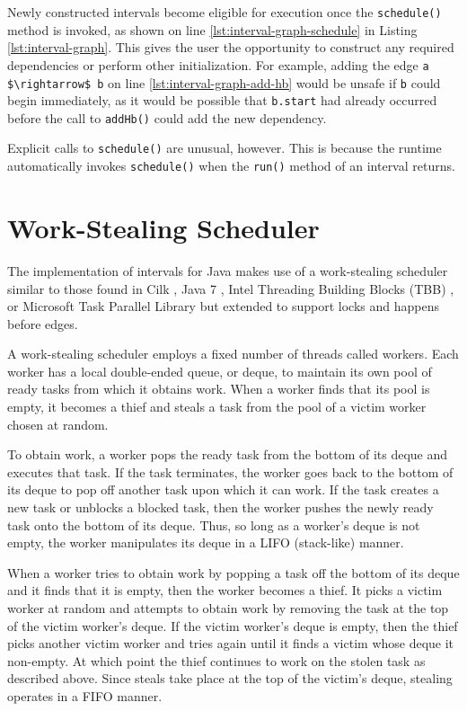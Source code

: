 Newly constructed intervals become eligible for execution once the
\lstinline|schedule()| method is invoked, as shown on line
\ref{lst:interval-graph-schedule} in Listing
\ref{lst:interval-graph}. This gives the user the opportunity to
construct any required dependencies or perform other
initialization. For example, adding the edge
\lstinline|a $\rightarrow$ b| on line \ref{lst:interval-graph-add-hb}
would be unsafe if \lstinline|b| could begin immediately, as it would
be possible that \lstinline|b.start| had already occurred before the
call to \lstinline|addHb()| could add the new dependency.

Explicit calls to \lstinline|schedule()| are unusual, however. This is
because the runtime automatically invokes \lstinline|schedule()| when
the \lstinline|run()| method of an interval returns.


\section{Work-Stealing Scheduler}
\label{sec:intro-work-stealing-scheduler}

The implementation of intervals for Java makes use of a work-stealing
scheduler similar to those found in Cilk \cite{Blumofe1995,
  Frigo1998}, Java 7 \cite{Lea2000, Lea2000a, Lea2006}, Intel
Threading Building Blocks (TBB) \cite{Reinders2007, Contreras2008}, or
Microsoft Task Parallel Library \cite{Leijen2009} but extended to
support locks and happens before edges.

A work-stealing scheduler employs a fixed number of threads called
workers. Each worker has a local double-ended queue, or deque, to
maintain its own pool of ready tasks from which it obtains work. When
a worker finds that its pool is empty, it becomes a thief and steals a
task from the pool of a victim worker chosen at random.

To obtain work, a worker pops the ready task from the bottom of its
deque and executes that task. If the task terminates, the worker goes
back to the bottom of its deque to pop off another task upon which it
can work. If the task creates a new task or unblocks a blocked task,
then the worker pushes the newly ready task onto the bottom of its
deque. Thus, so long as a worker's deque is not empty, the worker
manipulates its deque in a LIFO (stack-like) manner.

When a worker tries to obtain work by popping a task off the bottom of
its deque and it finds that it is empty, then the worker becomes a
thief. It picks a victim worker at random and attempts to obtain work
by removing the task at the top of the victim worker's deque. If the
victim worker's deque is empty, then the thief picks another victim
worker and tries again until it finds a victim whose deque it
non-empty. At which point the thief continues to work on the stolen
task as described above. Since steals take place at the top of the
victim's deque, stealing operates in a FIFO manner.

